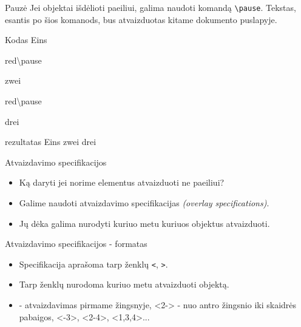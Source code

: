 \documentclass[11pt,a4paper]{beamer}
\begin{document}
\begin{frame}[fragile]{Pauzė}
	Jei objektai išdėlioti paeiliui, galima naudoti komandą \verb|\pause|. Tekstas, esantis po šios komanods, bus atvaizduotas kitame dokumento puslapyje.
	\begin{block}{Kodas}
		Eins \begin{color}{red}\textbackslash pause\end{color} zwei \begin{color}{red}\textbackslash pause\end{color} drei
	\end{block}
	\pause
	\begin{block}{rezultatas}
		Eins \pause zwei \pause drei
	\end{block}
\end{frame}
\begin{frame}{Atvaizdavimo specifikacijos}
	\begin{itemize}
		\item Ką daryti jei norime elementus atvaizduoti ne paeiliui?
		\item Galime naudoti atvaizdavimo specifikacijas \textit{(overlay specifications)}.
		\item Jų dėka galima nurodyti kuriuo metu kuriuos objektus atvaizduoti.
	\end{itemize}
\end{frame}
\begin{frame}[fragile]{Atvaizdavimo specifikacijos - formatas}
	\begin{itemize}
		\item Specifikacija aprašoma tarp ženklų \verb|<|, \verb|>|.
		\item Tarp ženklų nurodoma kuriuo metu atvaizduoti objektą.
		\item <1> - atvaizdavimas pirmame žingsnyje, <2-> - nuo antro žingsnio iki skaidrės pabaigos, <-3>, <2-4>, <1,3,4>...
	\end{itemize}
\end{frame}
\end{document}
